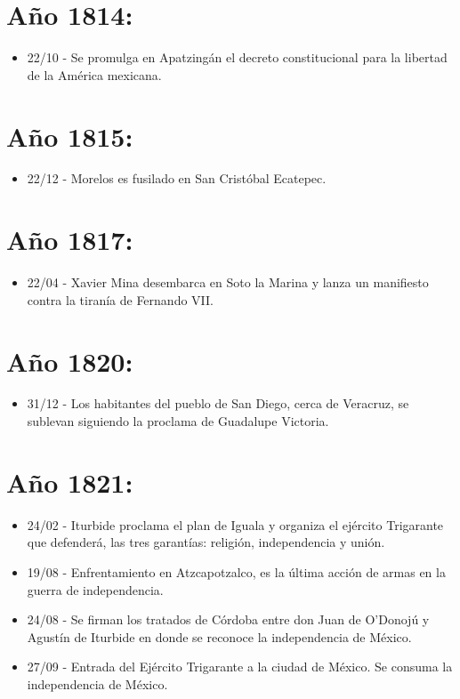 \section*{Año 1814:}

\begin{itemize}
\item 22/10 - Se promulga en Apatzingán el decreto constitucional para la libertad de la América mexicana.
\end{itemize}

\section*{Año 1815:}

\begin{itemize}
\item 22/12 - Morelos es fusilado en San Cristóbal Ecatepec.
\end{itemize}

\section*{Año 1817:}

\begin{itemize}
\item 22/04 - Xavier Mina desembarca en Soto la Marina y lanza un manifiesto contra la tiranía de Fernando VII.
\end{itemize}

\section*{Año 1820:}

\begin{itemize}
\item 31/12 - Los habitantes del pueblo de San Diego, cerca de Veracruz, se sublevan siguiendo la proclama de Guadalupe Victoria.
\end{itemize}

\section*{Año 1821:}

\begin{itemize}
\item 24/02 - Iturbide proclama el plan de Iguala y organiza el ejército Trigarante que defenderá, las tres garantías: religión, independencia y unión.
\item 19/08 - Enfrentamiento en Atzcapotzalco, es la última acción de armas en la guerra de independencia.
\item 24/08 - Se firman los tratados de Córdoba entre don Juan de O’Donojú y Agustín de Iturbide en donde se reconoce la independencia de México.
\item 27/09 - Entrada del Ejército Trigarante a la ciudad de México. Se consuma la independencia de México.
\end{itemize}

